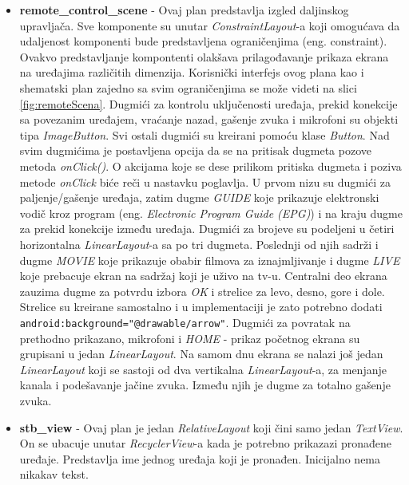 \documentclass[implementacija.tex]{subfiles}
\begin{document}
\begin{itemize}
\item \textbf{remote\_control\_scene} - Ovaj plan predstavlja izgled daljinskog upravljača. Sve komponente su unutar \textit{ConstraintLayout}-a koji omogućava da udaljenost komponenti bude predstavljena ograničenjima (eng. constraint). Ovakvo predstavljanje kompontenti olakšava prilagođavanje prikaza ekrana na uređajima različitih dimenzija. Korisnički interfejs ovog plana kao i shematski plan zajedno sa svim ograničenjima se može videti na slici \ref{fig:remoteScena}. Dugmići za kontrolu uključenosti uređaja, prekid konekcije sa povezanim uređajem, vraćanje nazad, gašenje zvuka i mikrofoni su objekti tipa \textit{ImageButton}. Svi ostali dugmići su kreirani pomoću klase \textit{Button}. Nad svim dugmićima je postavljena opcija da se na pritisak dugmeta pozove metoda \textit{onClick()}. O akcijama koje se dese prilikom pritiska dugmeta i poziva metode \textit{onClick} biće reči u nastavku poglavlja. U prvom nizu su dugmići za paljenje/gašenje uređaja, zatim dugme \textit{GUIDE} koje prikazuje elektronski vodič kroz program (eng. \textit{Electronic Program Guide (EPG)}) i na kraju dugme za prekid konekcije između uređaja. Dugmići za brojeve su podeljeni u četiri horizontalna \textit{LinearLayout}-a sa po tri dugmeta. Poslednji od njih sadrži i dugme \textit{MOVIE} koje prikazuje obabir filmova za iznajmljivanje i dugme \textit{LIVE} koje prebacuje ekran na sadržaj koji je uživo na tv-u. Centralni deo ekrana zauzima dugme za potvrdu izbora \textit{OK} i strelice za levo, desno, gore i dole. Strelice su kreirane samostalno i u implementaciji je zato potrebno dodati  \verb|android:background="@drawable/arrow"|. Dugmići za povratak na prethodno prikazano, mikrofoni i \textit{HOME} - prikaz početnog ekrana su grupisani u jedan \textit{LinearLayout}. Na samom dnu ekrana se nalazi još jedan \textit{LinearLayout} koji se sastoji od dva vertikalna \textit{LinearLayout}-a, za menjanje kanala i podešavanje jačine zvuka. Između njih je dugme za totalno gašenje zvuka.

\item \textbf{stb\_view} - Ovaj plan je jedan \textit{RelativeLayout} koji čini samo jedan \textit{TextView}. On se ubacuje unutar \textit{RecyclerView}-a kada je potrebno prikazazi pronađene uređaje. Predstavlja ime jednog uređaja koji je pronađen. Inicijalno nema nikakav tekst.
\end{itemize}
\end{document}
